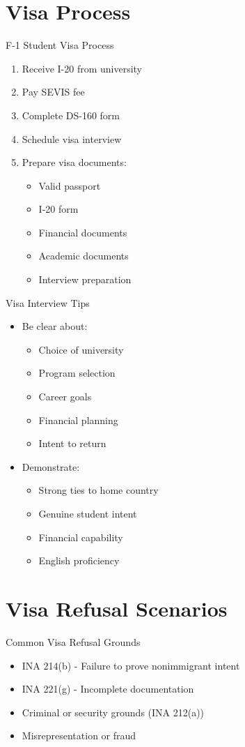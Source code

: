 \documentclass{beamer}
\begin{document}
\section{Visa Process}
\begin{frame}{F-1 Student Visa Process}
\begin{enumerate}
\item Receive I-20 from university
\item Pay SEVIS fee
\item Complete DS-160 form
\item Schedule visa interview
\item Prepare visa documents:
    \begin{itemize}
    \item Valid passport
    \item I-20 form
    \item Financial documents
    \item Academic documents
    \item Interview preparation
    \end{itemize}
\end{enumerate}
\end{frame}

\begin{frame}{Visa Interview Tips}
\begin{itemize}
\item Be clear about:
    \begin{itemize}
    \item Choice of university
    \item Program selection
    \item Career goals
    \item Financial planning
    \item Intent to return
    \end{itemize}
\item Demonstrate:
    \begin{itemize}
    \item Strong ties to home country
    \item Genuine student intent
    \item Financial capability
    \item English proficiency
    \end{itemize}
\end{itemize}
\end{frame}

\section{Visa Refusal Scenarios}
\begin{frame}{Common Visa Refusal Grounds}
\begin{itemize}
\item INA 214(b) - Failure to prove nonimmigrant intent
\item INA 221(g) - Incomplete documentation
\item Criminal or security grounds (INA 212(a))
\item Misrepresentation or fraud
\end{itemize}
\end{frame}
\end{document}
